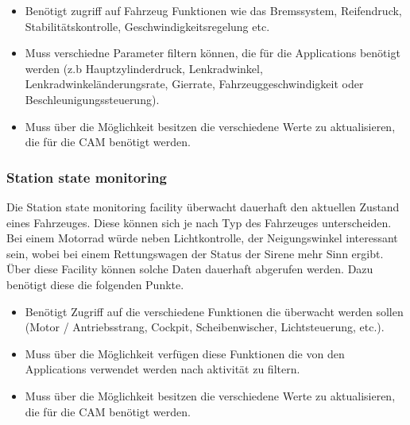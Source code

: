\begin{itemize}
\item Benötigt zugriff auf Fahrzeug Funktionen wie das Bremssystem, Reifendruck, Stabilitätskontrolle, Geschwindigkeitsregelung etc.
\item Muss verschiedne Parameter filtern können, die für die Applications benötigt werden (z.b Hauptzylinderdruck, Lenkradwinkel, Lenkradwinkeländerungsrate, Gierrate, Fahrzeuggeschwindigkeit oder Beschleunigungssteuerung).
\item Muss über die Möglichkeit besitzen die verschiedene Werte zu aktualisieren, die für die \acl{CAM} benötigt werden.
\end{itemize}

\subsubsection{Station state monitoring \label{facilitylayer_StationStateMonitoring}}
Die Station state monitoring facility überwacht dauerhaft den aktuellen Zustand eines Fahrzeuges. Diese können sich je nach Typ des Fahrzeuges unterscheiden. Bei einem Motorrad würde neben Lichtkontrolle, der Neigungswinkel interessant sein, wobei bei einem Rettungswagen der Status der Sirene mehr Sinn ergibt. Über diese Facility können solche Daten dauerhaft abgerufen werden. 
Dazu benötigt diese die folgenden Punkte.
\begin{itemize}
\item Benötigt Zugriff auf die verschiedene Funktionen die überwacht werden sollen (Motor / Antriebsstrang, Cockpit, Scheibenwischer, Lichtsteuerung, etc.).
\item Muss über die Möglichkeit verfügen diese Funktionen die von den Applications verwendet werden nach aktivität zu filtern.
\item Muss über die Möglichkeit besitzen die verschiedene Werte zu aktualisieren, die für die \acl{CAM} benötigt werden.
\end{itemize}

